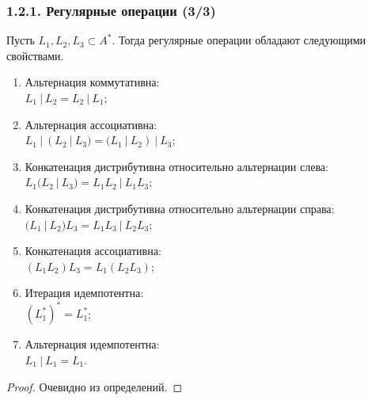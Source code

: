 \begin{frame}
\frametitle{1.2.1. Регулярные операции (3/3)}
\begin{theorem}
Пусть $L_1, L_2, L_3\subset A^*$. Тогда регулярные операции
обладают следующими свойствами.
\begin{enumerate}
  \item Альтернация коммутативна:\\[-2pt]
  $L_1~|~ L_2 = L_2~|~ L_1$;\\[-1pt]
  \item Альтернация ассоциативна:\\[-2pt]
  $L_1~|~ (L_2~|~ L_3) = (L_1~|~ L_2)~|~L_3$;\\[-1pt]
  \item Конкатенация дистрибутивна относительно альтернации слева:\\[-2pt]
  $L_1(L_2~|~ L_3) = L_1 L_2~|~ L_1 L_3$;\\[-1pt]
  \item Конкатенация дистрибутивна относительно альтернации справа:\\[-2pt]
$(L_1~|~ L_2)L_3 = L_1 L_3~|~ L_2 L_3$;\\[-1pt]
  \item Конкатенация ассоциативна:\\[-2pt]
  $(L_1 L_2)L_3 = L_1(L_2 L_3)$;\\[-1pt]
    \item Итерация идемпотентна:\\[-2pt]
  $(L_1^*)^* = L_1^*$;\\[-1pt]
      \item Альтернация идемпотентна:\\[-2pt]
  $L_1~|~L_1 = L_1$.\\[-1pt]
\end{enumerate}
\end{theorem}
\begin{proof}
Очевидно из определений.
\end{proof}
\end{frame}

